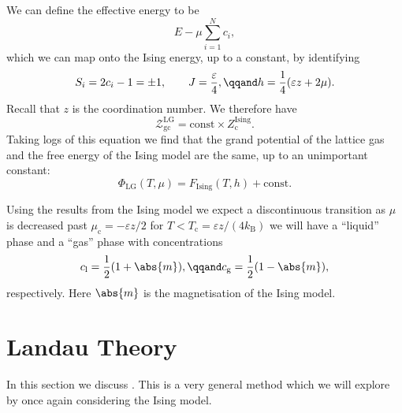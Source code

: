 \documentclass[fleqn]{NotesClass}
\newcommand*{\boltzmann}{k_{\mathrm{B}}}
\newcommand*{\cpartition}{Z_{\mathrm{c}}}
\newcommand*{\gcpartition}{\mathcal{Z}_{\mathrm{gc}}}
\begin{document}
    We can define the effective energy to be
    \begin{equation}
        E - \mu\sum_{i = 1}^{N} c_i,
    \end{equation}
    which we can map onto the Ising energy, up to a constant, by identifying
    \begin{equation}
        S_i = 2c_i -1 = \pm 1, \qquad J = \frac{\varepsilon}{4}, \qqand h = \frac{1}{4}(\varepsilon z + 2\mu).
    \end{equation}
    Recall that \(z\) is the coordination number.
    We therefore have
    \begin{equation}
        \gcpartition^{\mathrm{LG}} = \mathrm{const} \times \cpartition^{\mathrm{Ising}}.
    \end{equation}
    Taking logs of this equation we find that the grand potential of the lattice gas and the free energy of the Ising model are the same, up to an unimportant constant:
    \begin{equation}
        \Phi_{\mathrm{LG}}(T, \mu) = F_{\mathrm{Ising}}(T, h) + \mathrm{const}.
    \end{equation}
    
    Using the results from the Ising model we expect a discontinuous transition as \(\mu\) is decreased past \(\mu_{\mathrm{c}} = -\varepsilon z/2\) for \(T < T_{\mathrm{c}} = \varepsilon z/(4\boltzmann)\) we will have a \enquote{liquid} phase and a \enquote{gas} phase with concentrations
    \begin{equation}
        c_{\mathrm{l}} = \frac{1}{2}(1 + \abs{m}), \qqand c_{\mathrm{g}} = \frac{1}{2}(1 - \abs{m}),
    \end{equation}
    respectively.
    Here \(\abs{m}\) is the magnetisation of the Ising model.
    
    \chapter{Landau Theory}
    In this section we discuss .
    This is a very general method which we will explore by once again considering the Ising model.
    
\end{document}
